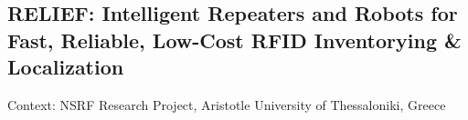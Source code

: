 \subsection{RELIEF: Intelligent Repeaters and Robots for Fast, Reliable, Low-Cost RFID Inventorying \& Localization}

Context: NSRF Research Project, Aristotle University of Thessaloniki, Greece\\

